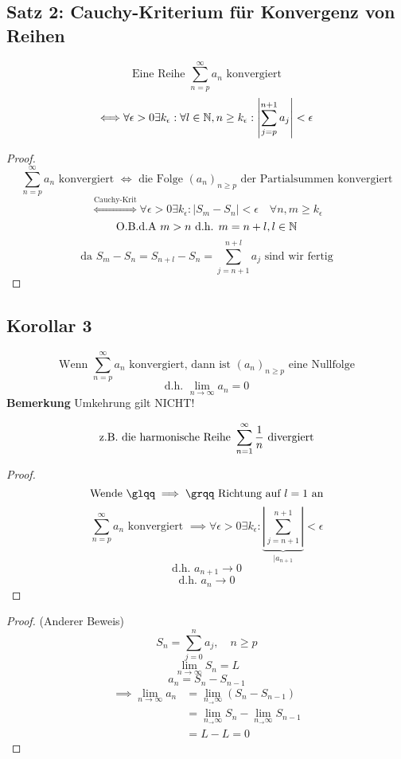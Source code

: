 \subsection{Satz 2: Cauchy-Kriterium für Konvergenz von Reihen}

\[\text{Eine Reihe } \sum_{n=p}^\infty a_n \text{ konvergiert} \]
\[\Longleftrightarrow \forall \epsilon > 0 \exists k_\epsilon : \forall l \in \mathbb{N}, n \geq k_\epsilon : \left|\sum_{j=p}^{n+1} a_j\right|<\epsilon\]


\begin{proof}
  \[\sum_{n=p}^\infty a_n \text{ konvergiert } \Longleftrightarrow \text{ die Folge } (a_n)_{n\geq p} \text{ der Partialsummen konvergiert}\]
  \[\stackrel{\text{Cauchy-Krit}}{\Longleftrightarrow} \forall \epsilon > 0 \exists k_\epsilon : | S_m -S_n | < \epsilon \quad \forall n,m \geq k_\epsilon\]
  \[\text{O.B.d.A } m>n \text{ d.h. } m=n+l,l\in \mathbb{N}\]
  \[\text{da } S_m-S_n = S_{n+l}- S_n = \sum_{j=n+1}^{n+l} a_j \text{ sind wir fertig}\]

\end{proof}

\subsection{Korollar 3}

\[\text{Wenn } \sum_{n=p}^\infty a_n \text{ konvergiert, dann ist } (a_n)_{n \geq p} \text{ eine Nullfolge} \]
\[\text{d.h. } \lim_{n\to \infty} a_n = 0\]
\textbf{Bemerkung}
Umkehrung gilt NICHT!

\[\text{z.B. die harmonische Reihe } \sum_{n=1}^{\infty} \frac{1}{n} \text{ divergiert}\]

\begin{proof}
  \[\text{Wende } \mqq{\implies} \text{ Richtung auf } l=1 \text{ an}\]
  \[\sum_{n=p}^\infty a_n \text{ konvergiert } \implies \forall \epsilon > 0 \exists k_\epsilon : \underbrace{\left| \sum_{j=n+1}^{n+1} \right|}_{|a_{n+1}}<\epsilon\]
  \[\text{d.h. } a_{n+1} \to 0\]
  \[\text{d.h. } a_{n} \to 0\]
\end{proof}

\begin{proof} (Anderer Beweis)
  \[S_n = \sum_{j=0}^n a_j, \quad n \geq p\]
  \[\lim_{n\to \infty} S_n = L\]
  \[a_n = S_n - S_{n-1}\]
  \begin{align*}
    \implies \lim_{n\to \infty} a_n & = \lim_{n_\to \infty} (S_n - S_{n-1}) \\
                                    & = \lim_{n_\to \infty} S_n - \lim_{n_\to \infty} S_{n-1} \\
                                    & = L-L = 0
  \end{align*}
 
\end{proof}

